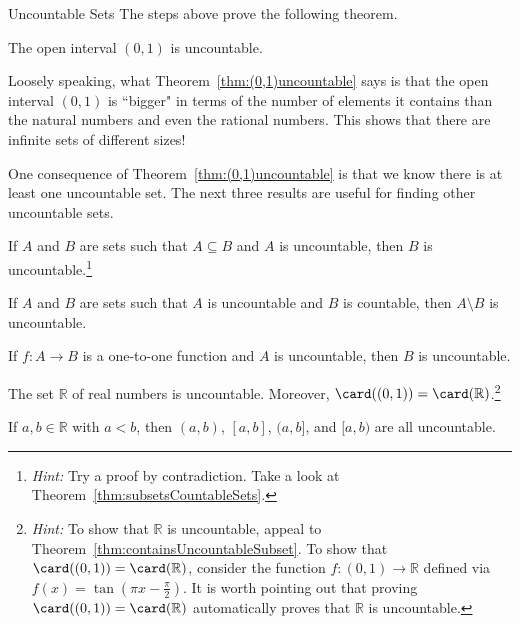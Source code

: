 \begin{section}{Uncountable Sets}
The steps above prove the following theorem.

\begin{theorem}\label{thm:(0,1)uncountable}
The open interval $(0,1)$ is uncountable.
\end{theorem}

Loosely speaking, what Theorem~\ref{thm:(0,1)uncountable} says is that the open interval $(0,1)$ is ``bigger" in terms of the number of elements it contains than the natural numbers and even the rational numbers.  This shows that there are infinite sets of different sizes!

One consequence of Theorem~\ref{thm:(0,1)uncountable} is that we know there is at least one uncountable set.  The next three results are useful for finding other uncountable sets.

\begin{theorem}\label{thm:containsUncountableSubset}
If $A$ and $B$ are sets such that $A\subseteq B$ and $A$ is uncountable, then $B$ is uncountable.\footnote{\emph{Hint:} Try a proof by contradiction. Take a look at Theorem~\ref{thm:subsetsCountableSets}.}
\end{theorem}

\begin{corollary}
If $A$ and $B$ are sets such that $A$ is uncountable and $B$ is countable, then $A\setminus B$ is uncountable.
\end{corollary}

\begin{theorem}
If $f:A\to B$ is a one-to-one function and $A$ is uncountable, then $B$ is uncountable.
\end{theorem}

\begin{theorem}
The set $\mathbb{R}$ of real numbers is uncountable.  Moreover, $\card((0,1))=\card(\mathbb{R})$.\footnote{\emph{Hint:} To show that $\mathbb{R}$ is uncountable, appeal to Theorem~\ref{thm:containsUncountableSubset}. To show that $\card((0,1))=\card(\mathbb{R})$, consider the function $f:(0,1)\to \mathbb{R}$ defined via $f(x)=\tan(\pi x-\frac{\pi}{2})$. It is worth pointing out that proving $\card((0,1))=\card(\mathbb{R})$ automatically proves that $\mathbb{R}$ is uncountable.}
\end{theorem}

\begin{theorem}
If $a,b\in\mathbb{R}$ with $a<b$, then $(a,b)$, $[a,b]$, $(a,b]$, and $[a,b)$ are all uncountable.
\end{theorem}


\end{section}
